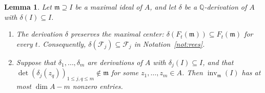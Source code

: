 \documentclass[11pt]{amsart}
\numberwithin{equation}{section}
\newtheorem{lemma}[theorem]{Lemma}
\theoremstyle{definition}
\newcommand{\Q}{\mathbb{Q}}
\newcommand{\fm}{\mathfrak{m}}
\newcommand{\cF}{\mathcal{F}}
\DeclareMathOperator{\inv}{inv}
\begin{document}
\begin{lemma}\label{lem:derivations}
Let $\fm\supseteq I$ be a maximal ideal of $A$, and let $\delta$ be a $\Q$-derivation of $A$ with $\delta(I)\subseteq I$.
\begin{enumerate}
\item The derivation $\delta$ preserves the maximal center: $\delta(F_t(\fm))\subseteq F_t(\fm)$ for every $t$. Consequently, $\delta(\cF_j)\subseteq\cF_j$ in Notation~\ref{not:rees}.
\item Suppose that $\delta_1,\ldots,\delta_m$ are derivations of $A$ with $\delta_j(I)\subseteq I$, and that $\det(\delta_j(z_q))_{1\le j,q\le m}\notin\fm$ for some $z_1,\ldots,z_m\in A$. Then $\inv_\fm(I)$ has at most $\dim A-m$ nonzero entries.
\end{enumerate}
\end{lemma}
\end{document}

